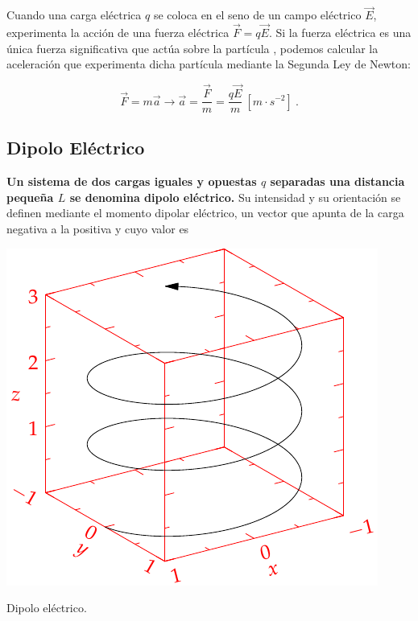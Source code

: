 \documentclass{tufte-handout}
\begin{document}
Cuando una carga eléctrica $q$ se coloca en el seno de un campo eléctrico $\vec{E}$, experimenta la acción de una fuerza eléctrica $\vec{F} = q\vec{E}$. Si la fuerza eléctrica es una única fuerza significativa que actúa sobre la partícula , podemos calcular la aceleración que experimenta dicha partícula mediante la Segunda Ley de Newton:

\begin{equation}
\vec{F} = m\vec{a} \rightarrow \vec{a} = \frac{\vec{F}}{m} = \frac{q\vec{E}}{m}~[m\cdot s^{-2}]~.
\end{equation}

\subsection{Dipolo Eléctrico}

\textbf{Un sistema de dos cargas iguales y opuestas $q$ separadas una distancia pequeña $L$ se denomina dipolo eléctrico.} Su intensidad y su orientación se definen mediante el momento dipolar eléctrico, un vector que apunta de la carga negativa a la positiva y cuyo valor es

\begin{marginfigure}%
    \includegraphics[width=\linewidth]{helix}
    \caption{Dipolo eléctrico.}
    \label{fig:dipolo}
\end{marginfigure}
\end{document}
